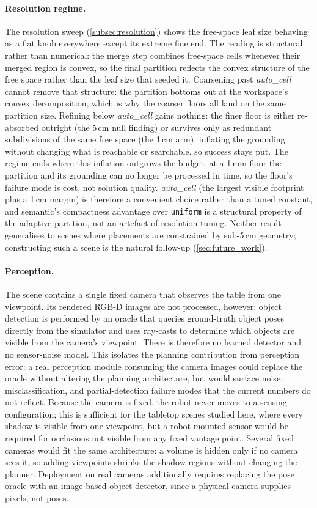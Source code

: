 \paragraph{Resolution regime.} The resolution sweep (\cref{subsec:resolution})
shows the free-space leaf size behaving as a flat knob everywhere except its
extreme fine end. The reading is structural rather than numerical: the merge
step combines free-space cells whenever their merged region is convex, so the
final partition reflects the convex structure of the free space rather than
the leaf size that seeded it. Coarsening past \emph{auto\_cell} cannot remove
that structure: the partition bottoms out at the workspace's convex
decomposition, which is why the coarser floors all land on the same partition
size. Refining below \emph{auto\_cell} gains nothing: the finer floor is
either re-absorbed outright (the 5\,cm null finding) or survives only as
redundant subdivisions of the same free space (the 1\,cm arm), inflating the
grounding without changing what is reachable or searchable, so success stays
put. The regime ends where this inflation outgrows the budget: at a 1\,mm
floor the partition and its grounding can no longer be processed in time, so
the floor's failure mode is cost, not solution quality. \emph{auto\_cell}
(the largest visible footprint plus a 1\,cm margin) is therefore a convenient
choice rather than a tuned constant, and semantic's compactness advantage
over \texttt{uniform} is a structural property of the adaptive partition, not
an artefact of resolution tuning. Neither result generalises to scenes where
placements are constrained by sub-5\,cm geometry; constructing such a scene
is the natural follow-up (\cref{sec:future_work}).

\paragraph{Perception.} The scene contains a single fixed camera
that observes the table from one viewpoint. Its rendered RGB-D images are not processed,
however: object detection is performed by an oracle that queries
ground-truth object poses directly from the simulator and uses ray-casts to
determine which objects are visible from the camera's viewpoint. There is
therefore no learned detector and no sensor-noise model. This isolates the
planning contribution from perception error: a real perception module
consuming the camera images could replace the oracle without altering the
planning architecture, but would surface noise, misclassification, and
partial-detection failure modes that the current numbers do not reflect. Because the camera is fixed, the robot never moves
to a sensing configuration; this is sufficient for the tabletop scenes
studied here, where every shadow is visible from one viewpoint, but a
robot-mounted sensor would be required for occlusions not visible from any
fixed vantage point. Several fixed cameras would fit the same architecture:
a volume is hidden only if no camera sees it, so adding viewpoints shrinks
the shadow regions without changing the planner. Deployment on real cameras
additionally requires replacing the pose oracle with an image-based object
detector, since a physical camera supplies pixels, not poses.

